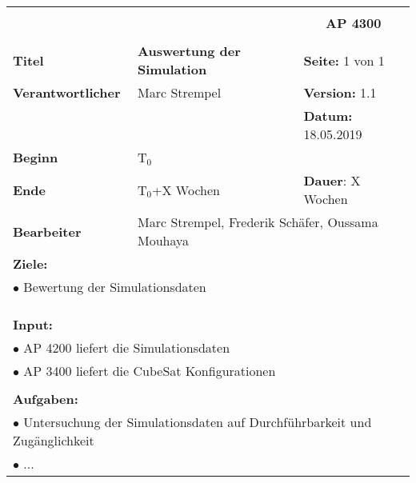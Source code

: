 \clearpage
\begin{table}[!h]
 \begin{center}
  \begin{tabular}{|p{35mm}||p{55mm}|p{50mm}||p{40mm}|}
   \hline
   \multicolumn{3}{|l||}{\textbf{}} & \multicolumn{1}{c|}{}\\
   \multicolumn{3}{|l||}{\textbf{}} & \multicolumn{1}{c|}{\textbf{AP 4300}}\\
   \multicolumn{3}{|l||}{\textbf{}} & \multicolumn{1}{c|}{}\\
   \hline\hline
   \textbf{Titel} & \multicolumn{2}{p{7cm}||}{\textbf{Auswertung der Simulation}} & \textbf{Seite:} 1 von 1\\
   \hline
   \textbf{Verantwortlicher} & \multicolumn{2}{l||}{Marc Strempel} & \textbf{Version:} 1.1\\
   \hline
   \multicolumn{3}{|l||}{} & \textbf{Datum:} 18.05.2019\\
   \hline\hline
   \textbf{Beginn} & \multicolumn{2}{l||}{T$_0$} & \\
   \hline
   \textbf{Ende} & \multicolumn{2}{l||}{T$_0$+X Wochen} & \textbf{Dauer}: X Wochen\\
   \hline\hline
   \textbf{Bearbeiter} & \multicolumn{3}{l|}{Marc Strempel, Frederik Schäfer, Oussama Mouhaya}\\
   \hline\hline
   \multicolumn{4}{|p{150mm}|}{\textbf{Ziele:}}\\
   \multicolumn{4}{|p{150mm}|}{$\bullet$ Bewertung der Simulationsdaten}\\
   \multicolumn{4}{|p{150mm}|}{}\\
   \multicolumn{4}{|p{150mm}|}{}\\
   \multicolumn{4}{|p{150mm}|}{}\\
   \multicolumn{4}{|p{150mm}|}{\textbf{Input:}}\\
   \multicolumn{4}{|p{150mm}|}{$\bullet$ AP 4200 liefert die Simulationsdaten}\\
   \multicolumn{4}{|p{150mm}|}{$\bullet$ AP 3400 liefert die CubeSat Konfigurationen}\\
   \multicolumn{4}{|p{150mm}|}{}\\
   \multicolumn{4}{|p{150mm}|}{\textbf{Aufgaben:}}\\
   \multicolumn{4}{|p{150mm}|}{$\bullet$ Untersuchung der Simulationsdaten auf Durchführbarkeit und Zugänglichkeit}\\
   \multicolumn{4}{|p{150mm}|}{$\bullet$ ...}\\

\end{tabular}
\end{center}
\end{table}
